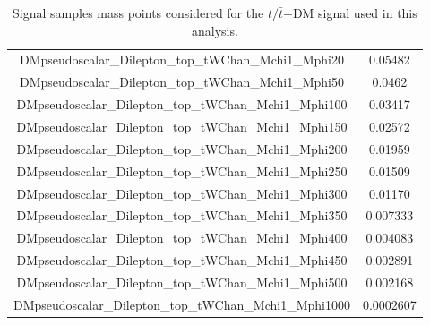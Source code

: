 \documentclass[a4paper, 10pt, openright]{report}
\begin{document}
\begin{appendices}
\begin{table}
\begin{center}
\begin{tabular}{ c|c }
 DMpseudoscalar\_Dilepton\_top\_tWChan\_Mchi1\_Mphi20 & 0.05482 \\
 DMpseudoscalar\_Dilepton\_top\_tWChan\_Mchi1\_Mphi50 & 0.0462 \\
 DMpseudoscalar\_Dilepton\_top\_tWChan\_Mchi1\_Mphi100 & 0.03417 \\
 DMpseudoscalar\_Dilepton\_top\_tWChan\_Mchi1\_Mphi150 & 0.02572 \\
 DMpseudoscalar\_Dilepton\_top\_tWChan\_Mchi1\_Mphi200 & 0.01959 \\
 DMpseudoscalar\_Dilepton\_top\_tWChan\_Mchi1\_Mphi250 & 0.01509 \\
 DMpseudoscalar\_Dilepton\_top\_tWChan\_Mchi1\_Mphi300 & 0.01170 \\
 DMpseudoscalar\_Dilepton\_top\_tWChan\_Mchi1\_Mphi350 & 0.007333 \\
 DMpseudoscalar\_Dilepton\_top\_tWChan\_Mchi1\_Mphi400 & 0.004083 \\
 DMpseudoscalar\_Dilepton\_top\_tWChan\_Mchi1\_Mphi450 & 0.002891 \\
 DMpseudoscalar\_Dilepton\_top\_tWChan\_Mchi1\_Mphi500 & 0.002168 \\
 DMpseudoscalar\_Dilepton\_top\_tWChan\_Mchi1\_Mphi1000 & 0.0002607 \\
 \hline
\end{tabular}
\caption{Signal samples mass points considered for the $t/ \bar t$+DM signal used in this analysis.}
\label{table:tDMsignals}
\end{center}
\end{table}


\end{appendices}
\end{document}
